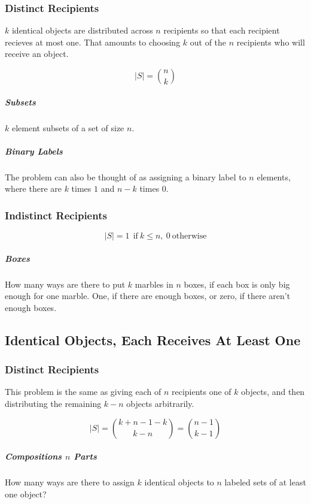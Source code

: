 \subsubsection{Distinct Recipients}
$k$ identical objects are distributed across $n$ recipients so that each recipient recieves at most one. That amounts to choosing $k$ out of the $n$ recipients who will receive an object.

\begin{equation}
|S| = { n \choose k}
\end{equation}


\subparagraph{Subsets} $k$ element subsets of a set of size $n$.

\subparagraph{Binary Labels} The problem can also be thought of as assigning a binary label to $n$ elements, where there are $k$ times $1$ and $n-k$ times 0.

\subsubsection{Indistinct Recipients}

\begin{equation}
|S| = 1\ \ \mathrm{if\ }k \leq n,\ 0\ \mathrm{otherwise}
\end{equation}  

\subparagraph{Boxes} How many ways are there to put $k$ marbles in $n$ boxes, if each box is only big enough for one marble. One, if there are enough boxes, or zero, if there aren't enough boxes.


\subsection{Identical Objects, Each Receives At Least One}

\subsubsection{Distinct Recipients}
This problem is the same as giving each of $n$ recipients one of $k$ objects, and then distributing the remaining $k-n$ objects arbitrarily.  

\begin{equation}
|S| = {k+n-1-k \choose k-n}= {n-1 \choose k-1}
\end{equation}

\subparagraph{Compositions $n$ Parts} How many ways are there to assign $k$ identical objects to $n$ labeled sets of at least one object?

